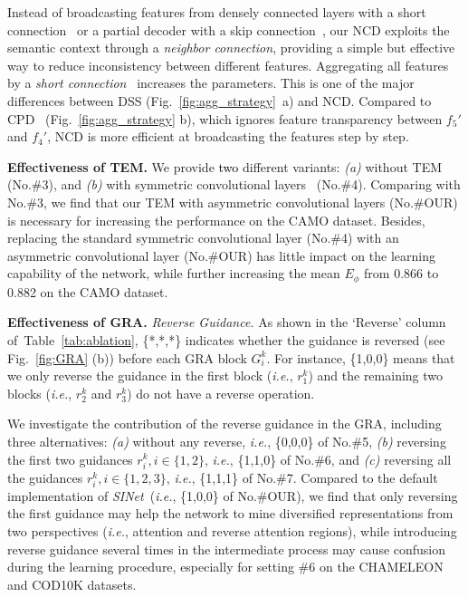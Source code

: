 \documentclass[10pt,journal,compsoc]{IEEEtran}
\def\ie{\emph{i.e.}}
\newcommand{\myPara}[1]{\vspace{6pt}\noindent\textbf{#1}\qquad }
\newcommand{\figref}[1]{Fig.~\ref{#1}}
\newcommand{\tabref}[1]{Table~\ref{#1}}
\newcommand{\Rev}[1]{\textcolor{black}{#1}}
\def\ournewmodel{\emph{SINet}}
\begin{document}
Instead of broadcasting features from densely connected layers with a short 
connection~\cite{HouPami19Dss} or a partial decoder with a 
skip connection~\cite{wu2019cascaded}, 
our NCD exploits the semantic context through a \textit{neighbor connection},
providing a simple but effective way to reduce inconsistency between 
different features.
%
Aggregating all features by a \textit{short connection}~\cite{HouPami19Dss} 
increases the parameters. 
This is one of the major differences between DSS (\figref{fig:agg_strategy}~a) 
and NCD. 
Compared to CPD~\cite{wu2019cascaded} (\figref{fig:agg_strategy} b), 
which ignores feature transparency between $f_5'$ and $f_4'$, 
NCD is more efficient at broadcasting the features step by step.



\myPara{Effectiveness of TEM.}
%
We provide \Rev{two} different variants:
%
\textit{(a)} without TEM (No.\#3), and
%
\textit{(b)} with symmetric convolutional layers~\cite{szegedy2016rethinking}  
(No.\#4).
%
Comparing with No.\#3, we find that our TEM with asymmetric convolutional 
layers (No.\#OUR) is necessary for 
increasing the performance on the CAMO dataset.
%
Besides, replacing the standard symmetric convolutional layer (No.\#4) 
with an asymmetric convolutional layer (No.\#OUR) has little impact 
on the learning capability of the network, 
while further increasing the mean $E_\phi$ from 0.866 to 0.882 on the 
CAMO dataset. 


\myPara{Effectiveness of GRA.}
%
\textit{Reverse Guidance.} 
As shown in the `Reverse' column of~\tabref{tab:ablation}, \{*,*,*\} 
indicates whether the guidance is reversed (see \figref{fig:GRA} (b)) 
before each GRA block $G^k_i$.
%
For instance, \{1,0,0\} means that we only reverse the guidance in the first 
block (\ie, $r^k_1$) and the remaining two blocks (\ie, $r^k_2$ and $r^k_3$) 
do not have a reverse operation.
%

We investigate the contribution of the reverse guidance in the GRA, 
including three alternatives:
%
\textit{(a)} without any reverse, \ie, \{0,0,0\} of No.\#5, 
%
\textit{(b)} reversing the first two guidances $r^k_i, i \in \{ 1, 2\}$, 
\ie, \{1,1,0\} of No.\#6, and 
%
\textit{(c)} reversing all the guidances $r^k_i, i \in \{ 1, 2, 3\}$, 
\ie, \{1,1,1\} of No.\#7. 
%
Compared to the default implementation of \ournewmodel~(\ie, \{1,0,0\} 
of No.\#OUR), 
we find that only reversing the first guidance may help the network 
to mine diversified representations from two perspectives 
(\ie, attention and reverse attention regions), 
while introducing reverse guidance several times in the intermediate process 
may cause confusion during the learning procedure, 
especially for setting \#6 on the CHAMELEON and COD10K datasets.
\end{document}
